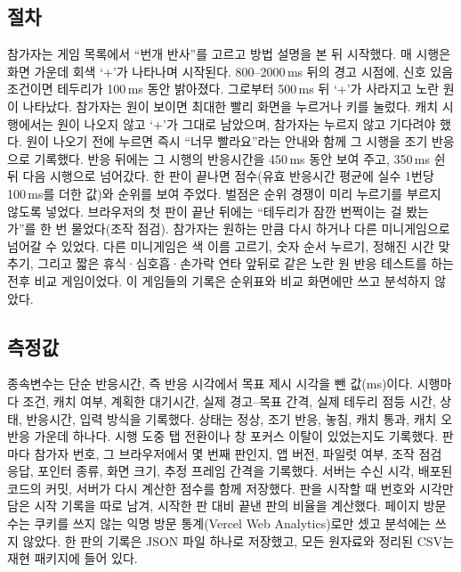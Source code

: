 \subsection{절차}
참가자는 게임 목록에서 ``번개 반사''를 고르고 방법 설명을 본 뒤 시작했다.
매 시행은 화면 가운데 회색 `+'가 나타나며 시작된다.
800--2000\,ms 뒤의 경고 시점에, 신호 있음 조건이면 테두리가 100\,ms 동안 밝아졌다.
그로부터 500\,ms 뒤 `+'가 사라지고 노란 원이 나타났다.
참가자는 원이 보이면 최대한 빨리 화면을 누르거나 키를 눌렀다.
캐치 시행에서는 원이 나오지 않고 `+'가 그대로 남았으며, 참가자는 누르지 않고 기다려야 했다.
원이 나오기 전에 누르면 즉시 ``너무 빨라요''라는 안내와 함께 그 시행을 조기 반응으로 기록했다.
반응 뒤에는 그 시행의 반응시간을 450\,ms 동안 보여 주고, 350\,ms 쉰 뒤 다음 시행으로 넘어갔다.
한 판이 끝나면 점수(유효 반응시간 평균에 실수 1번당 100\,ms를 더한 값)와 순위를 보여 주었다.
벌점은 순위 경쟁이 미리 누르기를 부르지 않도록 넣었다.
브라우저의 첫 판이 끝난 뒤에는 ``테두리가 잠깐 번쩍이는 걸 봤는가''를 한 번 물었다(조작 점검).
참가자는 원하는 만큼 다시 하거나 다른 미니게임으로 넘어갈 수 있었다.
다른 미니게임은 색 이름 고르기, 숫자 순서 누르기, 정해진 시간 맞추기, 그리고 짧은 휴식·심호흡·손가락 연타 앞뒤로 같은 노란 원 반응 테스트를 하는 전후 비교 게임이었다.
이 게임들의 기록은 순위표와 비교 화면에만 쓰고 분석하지 않았다.

\subsection{측정값}
종속변수는 단순 반응시간, 즉 반응 시각에서 목표 제시 시각을 뺀 값(ms)이다.
시행마다 조건, 캐치 여부, 계획한 대기시간, 실제 경고--목표 간격, 실제 테두리 점등 시간, 상태, 반응시간, 입력 방식을 기록했다.
상태는 정상, 조기 반응, 놓침, 캐치 통과, 캐치 오반응 가운데 하나다.
시행 도중 탭 전환이나 창 포커스 이탈이 있었는지도 기록했다.
판마다 참가자 번호, 그 브라우저에서 몇 번째 판인지, 앱 버전, 파일럿 여부, 조작 점검 응답, 포인터 종류, 화면 크기, 추정 프레임 간격을 기록했다.
서버는 수신 시각, 배포된 코드의 커밋, 서버가 다시 계산한 점수를 함께 저장했다.
판을 시작할 때 번호와 시각만 담은 시작 기록을 따로 남겨, 시작한 판 대비 끝낸 판의 비율을 계산했다.
페이지 방문 수는 쿠키를 쓰지 않는 익명 방문 통계(Vercel Web Analytics)로만 셌고 분석에는 쓰지 않았다.
한 판의 기록은 JSON 파일 하나로 저장했고, 모든 원자료와 정리된 CSV는 재현 패키지에 들어 있다.

